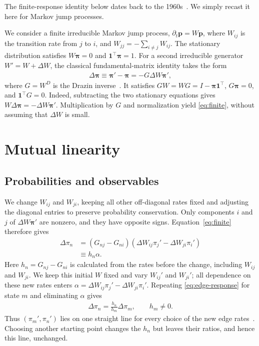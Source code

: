 \documentclass[
  reprint,
  superscriptaddress,
  amsmath,
  amssymb,
  aps,
  pre,
  longbibliography
]{revtex4-2}
\begin{document}
The finite-response identity below dates back to the
1960s~\cite{Schweitzer1968}. We simply recast it here for Markov jump
processes.

We consider a finite irreducible Markov jump process,
$\partial_t\bm p=W\bm p$, where $W_{ij}$ is the transition rate from
$j$ to $i$, and $W_{jj}=-\sum_{i\ne j}W_{ij}$.
The stationary distribution satisfies $W\bm\pi=0$ and
$\bm1^\intercal\bm\pi=1$.
For a second irreducible generator $W'=W+\Delta W$, the classical
fundamental-matrix identity takes the form
\begin{align}
    \Delta\bm\pi\equiv\bm\pi'-\bm\pi=-G\Delta W\bm\pi',
    \label{eq:finite}
\end{align}
where $G=W^D$ is the Drazin inverse~\cite{Meyer1975}.
It satisfies $GW=WG=I-\bm\pi\bm1^\intercal$,
$G\bm\pi=0$, and $\bm1^\intercal G=0$.
Indeed, subtracting the two stationary equations gives
$W\Delta\bm\pi=-\Delta W\bm\pi'$.
Multiplication by $G$ and normalization yield \cref{eq:finite},
without assuming that $\Delta W$ is small.

\section{Mutual linearity}
\label{sec:mutual-linearity}

\subsection{Probabilities and observables}

We change $W_{ij}$ and $W_{ji}$,
keeping all other off-diagonal rates fixed and adjusting the diagonal
entries to preserve probability conservation.
Only components $i$ and $j$ of $\Delta W\bm\pi'$ are nonzero,
and they have opposite signs. Equation~\eqref{eq:finite} therefore gives
\begin{align}
    \Delta\pi_n
    &=(G_{nj}-G_{ni})
      (\Delta W_{ij}\pi_j'-\Delta W_{ji}\pi_i')
    \nonumber\\
    &\equiv h_n\alpha.
    \label{eq:edge-response}
\end{align}
Here $h_n=G_{nj}-G_{ni}$ is calculated from the rates before the change,
including $W_{ij}$ and $W_{ji}$.
We keep this initial $W$ fixed and vary $W_{ij}'$ and $W_{ji}'$;
all dependence on these new rates enters
$\alpha=\Delta W_{ij}\pi_j'-\Delta W_{ji}\pi_i'$.
Repeating \cref{eq:edge-response} for state $m$ and eliminating $\alpha$ gives
\begin{align}
    \Delta\pi_n=\frac{h_n}{h_m}\Delta\pi_m,
    \qquad h_m\ne0.
    \label{eq:probabilities}
\end{align}
Thus $(\pi_m',\pi_n')$ lies on one straight line for every choice of
the new edge rates~\cite{BebonSpeck2026}.
Choosing another starting point changes the $h_n$ but leaves their ratios,
and hence this line, unchanged.
\end{document}
